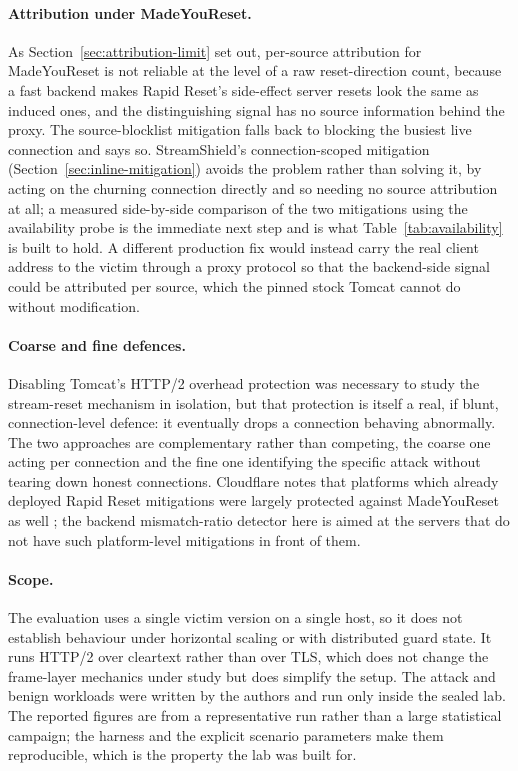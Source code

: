 \documentclass[a4paper,fleqn]{cas-dc}
\begin{document}
\paragraph{Attribution under MadeYouReset.} As Section~\ref{sec:attribution-limit} set out, per-source attribution for MadeYouReset is not reliable at the level of a raw reset-direction count, because a fast backend makes Rapid Reset's side-effect server resets look the same as induced ones, and the distinguishing signal has no source information behind the proxy. The source-blocklist mitigation falls back to blocking the busiest live connection and says so. StreamShield's connection-scoped mitigation (Section~\ref{sec:inline-mitigation}) avoids the problem rather than solving it, by acting on the churning connection directly and so needing no source attribution at all; a measured side-by-side comparison of the two mitigations using the availability probe is the immediate next step and is what Table~\ref{tab:availability} is built to hold. A different production fix would instead carry the real client address to the victim through a proxy protocol so that the backend-side signal could be attributed per source, which the pinned stock Tomcat cannot do without modification.

\paragraph{Coarse and fine defences.} Disabling Tomcat's HTTP/2 overhead protection was necessary to study the stream-reset mechanism in isolation, but that protection is itself a real, if blunt, connection-level defence: it eventually drops a connection behaving abnormally. The two approaches are complementary rather than competing, the coarse one acting per connection and the fine one identifying the specific attack without tearing down honest connections. Cloudflare notes that platforms which already deployed Rapid Reset mitigations were largely protected against MadeYouReset as well \cite{madeyouresetCloudflare}; the backend mismatch-ratio detector here is aimed at the servers that do not have such platform-level mitigations in front of them.

\paragraph{Scope.} The evaluation uses a single victim version on a single host, so it does not establish behaviour under horizontal scaling or with distributed guard state. It runs HTTP/2 over cleartext rather than over TLS, which does not change the frame-layer mechanics under study but does simplify the setup. The attack and benign workloads were written by the authors and run only inside the sealed lab. The reported figures are from a representative run rather than a large statistical campaign; the harness and the explicit scenario parameters make them reproducible, which is the property the lab was built for.
\end{document}
